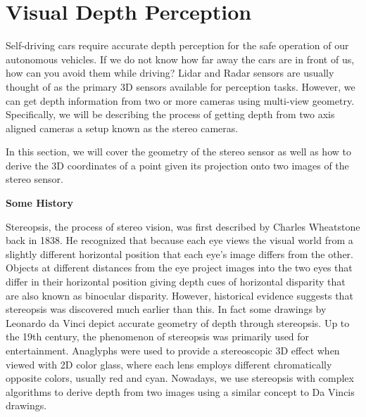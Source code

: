 \section{Visual Depth Perception}
\label{visual_depth_perception}

Self-driving cars require accurate depth perception for the safe operation of
our autonomous vehicles. If we do not know how far away the cars are in front of us, how can you avoid them while driving? 
Lidar and Radar sensors are usually thought of as the primary 3D sensors
available for perception tasks. However, we can get depth information from two or more cameras using
multi-view geometry. Specifically, we will be describing the process of getting depth from two axis aligned cameras a setup known as
the stereo cameras. 

In this section, we will cover the geometry of the stereo sensor
as well as how to derive the 3D coordinates of a point given its projection onto two images
of the stereo sensor. 

\begin{framed}
\begin{remark}{\textbf{Some History}}

Stereopsis, the process of stereo vision, was first described by
Charles Wheatstone back in 1838. He recognized that because each eye views
the visual world from a slightly different
horizontal position that each eye's image
differs from the other. Objects at different
distances from the eye project images into
the two eyes that differ in their horizontal position
giving depth cues of horizontal disparity that are also known as
binocular disparity. However, historical evidence suggests that stereopsis was discovered
much earlier than this. In fact some drawings by Leonardo da Vinci depict accurate geometry of
depth through stereopsis. Up to the 19th century, the phenomenon of stereopsis was primarily used for entertainment. 
Anaglyphs were used to provide a stereoscopic 3D effect when viewed with 2D color glass, where each lens employs different chromatically
opposite colors, usually red and cyan. Nowadays, we use stereopsis with complex algorithms to derive depth from two images using a similar concept to
Da Vincis drawings. 
\end{remark}
\end{framed}


